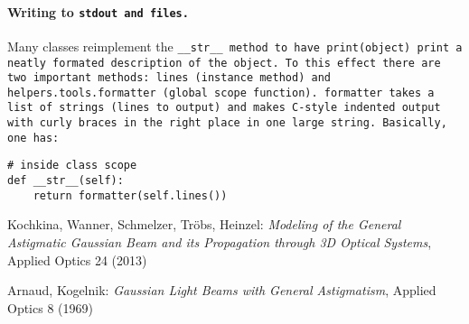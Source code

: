 \documentclass{article}
\begin{document}
\paragraph{Writing to \tt{stdout} and files.}Many classes reimplement the \tt{\_\_str\_\_} method to have \tt{print(object)} print a neatly formated description of the object. To this effect there are two important methods: \tt{lines} (instance method) and \tt{helpers.tools.formatter} (global scope function). \tt{formatter} takes a list of strings (lines to output) and makes C-style indented output with curly braces in the right place in one large string. Basically, one has:

\begin{lstlisting}
# inside class scope
def __str__(self):
	return formatter(self.lines())

\end{lstlisting}

\begin{thebibliography}{99}

Kochkina, Wanner, Schmelzer, Tr\"obs, Heinzel:
\textit{Modeling of the General Astigmatic Gaussian Beam and its Propagation through 3D Optical Systems},
Applied Optics 24 (2013)

Arnaud, Kogelnik:
\textit{Gaussian Light Beams with General Astigmatism},
Applied Optics 8 (1969)

\end{thebibliography}
\end{document}
